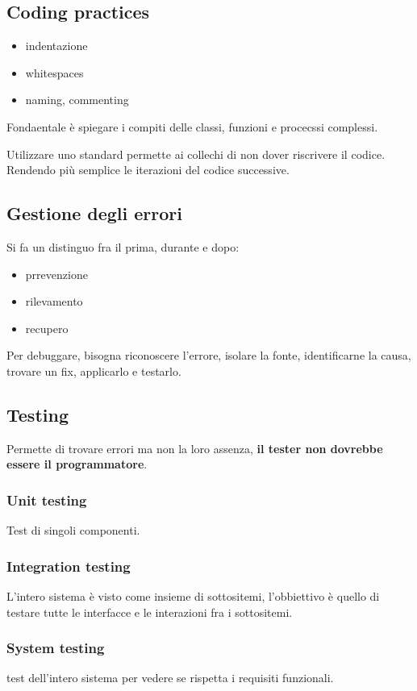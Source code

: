 \documentclass{article}
\begin{document}
\subsection{Coding practices}
\begin{itemize}
    \item indentazione
    \item whitespaces
    \item naming, commenting
\end{itemize}

Fondaentale è spiegare i compiti delle classi, funzioni e procecssi complessi.

Utilizzare uno standard permette ai collechi di non dover riscrivere il codice.
Rendendo più semplice le iterazioni del codice successive.

\subsection{Gestione degli errori}
Si fa un distinguo fra il prima, durante e dopo:
\begin{itemize}
    \item prrevenzione
    \item rilevamento
    \item recupero
\end{itemize}

Per debuggare, bisogna riconoscere l'errore, isolare la fonte, identificarne la causa,
trovare un fix, applicarlo e testarlo.

\subsection{Testing}
Permette di trovare errori ma non la loro assenza, \textbf{il tester non dovrebbe
essere il programmatore}.

\subsubsection{Unit testing}
Test di singoli componenti.

\subsubsection{Integration testing}

L'intero sistema è visto come insieme di sottositemi, l'obbiettivo è quello di testare tutte le interfacce e le 
interazioni fra i sottositemi.

\subsubsection{System testing}
test dell'intero sistema per vedere se rispetta i requisiti funzionali.
\end{document}
